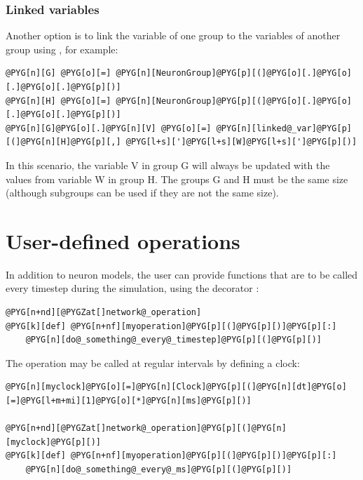 \documentclass[letterpaper,10pt,english]{manual}
\begin{document}
\subsubsection{Linked variables}

Another option is to link the variable of one group to the variables of another group using
\hyperlink{brian.linked_var}{}, for example:

\begin{Verbatim}[commandchars=@\[\]]
@PYG[n][G] @PYG[o][=] @PYG[n][NeuronGroup]@PYG[p][(]@PYG[o][.]@PYG[o][.]@PYG[o][.]@PYG[p][)]
@PYG[n][H] @PYG[o][=] @PYG[n][NeuronGroup]@PYG[p][(]@PYG[o][.]@PYG[o][.]@PYG[o][.]@PYG[p][)]
@PYG[n][G]@PYG[o][.]@PYG[n][V] @PYG[o][=] @PYG[n][linked@_var]@PYG[p][(]@PYG[n][H]@PYG[p][,] @PYG[l+s][']@PYG[l+s][W]@PYG[l+s][']@PYG[p][)]
\end{Verbatim}

In this scenario, the variable V in group G will always be updated with
the values from variable W in group H. The groups G and H must be the
same size (although subgroups can be used if they are not the same size).

\resetcurrentobjects
\hypertarget{--doc-operations}{}

\section{User-defined operations}

In addition to neuron models, the user can provide functions that are to be called every timestep
during the simulation, using the decorator \hyperlink{brian.network_operation}{}:

\begin{Verbatim}[commandchars=@\[\]]
@PYG[n+nd][@PYGZat[]network@_operation]
@PYG[k][def] @PYG[n+nf][myoperation]@PYG[p][(]@PYG[p][)]@PYG[p][:]
    @PYG[n][do@_something@_every@_timestep]@PYG[p][(]@PYG[p][)]
\end{Verbatim}

The operation may be called at regular intervals by defining a clock:

\begin{Verbatim}[commandchars=@\[\]]
@PYG[n][myclock]@PYG[o][=]@PYG[n][Clock]@PYG[p][(]@PYG[n][dt]@PYG[o][=]@PYG[l+m+mi][1]@PYG[o][*]@PYG[n][ms]@PYG[p][)]

@PYG[n+nd][@PYGZat[]network@_operation]@PYG[p][(]@PYG[n][myclock]@PYG[p][)]
@PYG[k][def] @PYG[n+nf][myoperation]@PYG[p][(]@PYG[p][)]@PYG[p][:]
    @PYG[n][do@_something@_every@_ms]@PYG[p][(]@PYG[p][)]
\end{Verbatim}
\end{document}
